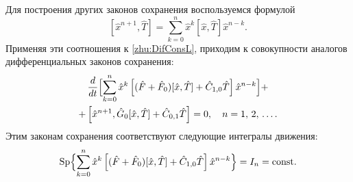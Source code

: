     Для построения других законов сохранения воспользуемся формулой
    \begin{equation*}
          [\hat{x}^{n+1},\hat{T}]=\sum\limits_{k=0}^{n}\hat{x}^k [\hat{x},\hat{T}]
          \hat{x}^{n-k}.
    \end{equation*}
    Применяя эти соотношения к \eqref{zhu:DifConsL}, приходим к совокупности
    аналогов дифференциальных законов сохранения:
    \begin{multline*}
    \frac{d}{dt}\Bigl[\sum\limits_{k=0}^{n}\hat{x}^k\left[(\hat{F}+\hat{F}_0)[\hat{x},\hat{T}]+\hat{C}_{1,0}\hat{T} \right]\hat{x}^{n-k}\Bigr]+\\
    +\left[\hat{x}^{n+1},\hat{G}_0[\hat{x},\hat{T}]+\hat{C}_{0,1}\hat{T}\right]=0, \quad n=1,\,2,\,\ldots.
    \end{multline*}
    Этим законам сохранения соответствуют следующие интегралы
    движения:
    \begin{equation*}
    \text{Sp}\Bigl\{\sum\limits_{k=0}^{n}\hat{x}^k\left[(\hat{F}+\hat{F}_0)[\hat{x},\hat{T}]+\hat{C}_{1,0}\hat{T}
        \right]\hat{x}^{n-k}\Bigr\}=I_n=\text{const}.
    \end{equation*}

\smallskip

